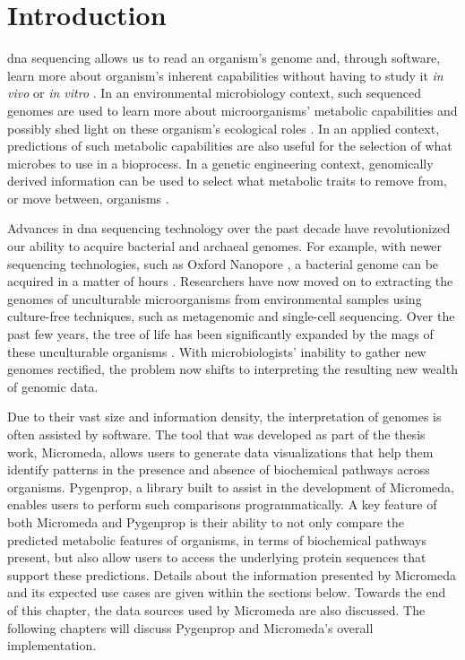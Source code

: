 \chapter{Introduction} \label{introduction}

\gls{dna} sequencing allows us to read an organism's genome and, through 
software, learn more about organism's inherent capabilities without having to 
study it \textit{in vivo} or \textit{in vitro} \cite{de2012bioinformatic}. In an 
environmental microbiology context, such sequenced genomes are used to learn 
more about microorganisms' metabolic capabilities and possibly shed light on 
these organism's ecological roles \cite{de2012bioinformatic}. In an applied 
context, predictions of such metabolic capabilities are also useful for the 
selection of what microbes to use in a bioprocess. In a genetic engineering 
context, genomically derived information can be used to select what metabolic 
traits to remove from, or move between, organisms 
\cite{strohl2001biochemical,sanchez2005novel}.

Advances in \gls{dna} sequencing technology over the past decade have 
revolutionized our ability to acquire bacterial and archaeal genomes. For 
example, with newer sequencing technologies, such as Oxford Nanopore 
\cite{jain2016oxford}, a bacterial genome can be acquired in a matter of hours 
\cite{Lu2016,Cao2017}. Researchers have now moved on to extracting the genomes 
of unculturable microorganisms from environmental samples using culture-free 
techniques, such as metagenomic \cite{quince2017shotgun} and single-cell 
\cite{gawad2016single} sequencing. Over the past few years, the tree of life has 
been significantly expanded by the \gls{mags} \cite{bowers2017minimum} of these 
unculturable organisms \cite{Hug2016,Parks2017}. With microbiologists' inability 
to gather new genomes rectified, the problem now shifts to interpreting the 
resulting new wealth of genomic data.

Due to their vast size and information density, the interpretation of genomes is 
often assisted by software. The tool that was developed as part of the thesis 
work, Micromeda, allows users to generate data visualizations that help them 
identify patterns in the presence and absence of biochemical pathways across 
organisms. Pygenprop, a library built to assist in the development of Micromeda, 
enables users to perform such comparisons programmatically. A key feature of 
both Micromeda and Pygenprop is their ability to not only compare the predicted 
metabolic features of organisms, in terms of biochemical pathways present, but 
also allow users to access the underlying protein sequences that support these 
predictions. Details about the information presented by Micromeda and its 
expected use cases are given within the sections below. Towards the end of this 
chapter, the data sources used by Micromeda are also discussed. The following 
chapters will discuss Pygenprop and Micromeda's overall implementation.

